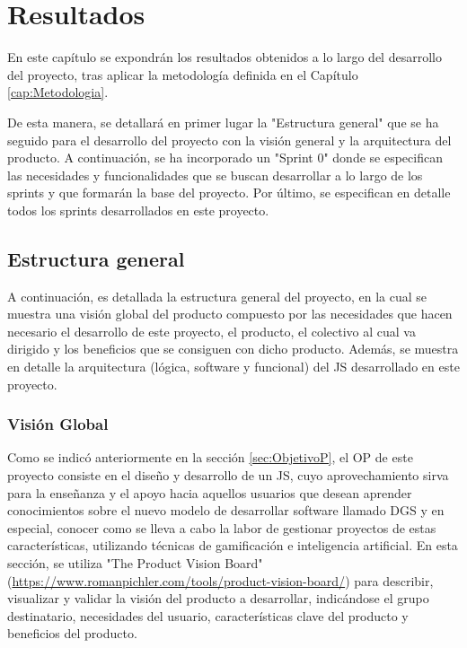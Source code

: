 \chapter{Resultados}
\label{cap:Resultados}

En este capítulo se expondrán los resultados obtenidos a lo largo del desarrollo del proyecto, tras aplicar la metodología definida en el Capítulo \ref{cap:Metodologia}.

De esta manera, se detallará en primer lugar la "Estructura general" que se ha seguido para el desarrollo del proyecto con la visión general y la arquitectura del producto. A continuación, se ha incorporado un "Sprint 0" donde se especifican las necesidades y funcionalidades que se buscan desarrollar a lo largo de los sprints y que formarán la base del proyecto. Por último, se especifican en detalle todos los sprints desarrollados en este proyecto. 

\section{Estructura general}
\label{sec:EstructuraGeneral}

A continuación, es detallada la estructura general del proyecto, en la cual se muestra una visión global del producto compuesto por las necesidades que hacen necesario el desarrollo de este proyecto, el producto, el colectivo al cual va dirigido y los beneficios que se consiguen con dicho producto. Además, se muestra en detalle la arquitectura (lógica, software y funcional) del JS desarrollado en este proyecto.

\subsection{Visión Global}
\label{sec:VisionGlobal}

Como se indicó anteriormente en la sección \ref{sec:ObjetivoP}, el OP de este proyecto consiste en el diseño y desarrollo de un JS, cuyo aprovechamiento sirva para la enseñanza y el apoyo hacia aquellos usuarios que desean aprender conocimientos sobre el nuevo modelo de desarrollar software llamado DGS y en especial, conocer como se lleva a cabo la labor de gestionar proyectos de estas características, utilizando técnicas de gamificación e inteligencia artificial. En esta sección, se utiliza "The Product Vision Board" (\url{https://www.romanpichler.com/tools/product-vision-board/}) para describir, visualizar y validar la visión del producto a desarrollar, indicándose el grupo destinatario, necesidades del usuario, características clave del producto y beneficios del producto.

